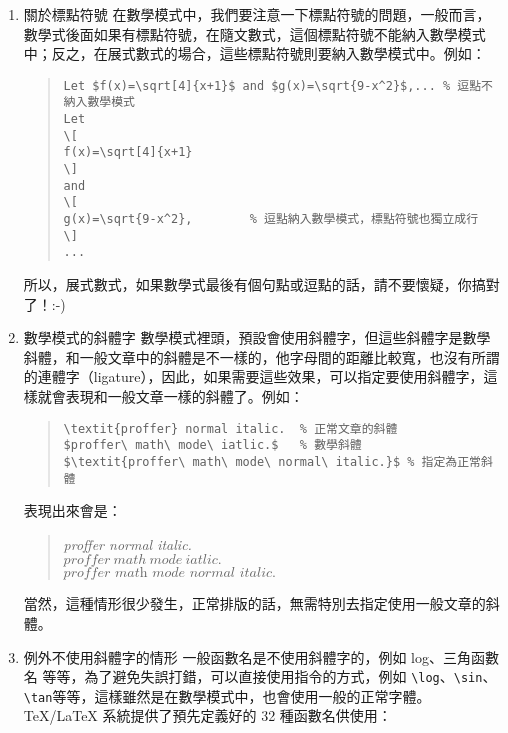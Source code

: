 \begin{enumerate}

  \item 關於標點符號 \newline
        在數學模式中，我們要注意一下標點符號的問題，一般而言，數學式後面如果有標點符號，在隨文數式，這個標點符號不能納入數學模式中；反之，在展式數式的場合，這些標點符號則要納入數學模式中。例如：

        \begin{quote}
          \begin{verbatim}
Let $f(x)=\sqrt[4]{x+1}$ and $g(x)=\sqrt{9-x^2}$,... % 逗點不納入數學模式
Let
\[
f(x)=\sqrt[4]{x+1}
\]
and
\[
g(x)=\sqrt{9-x^2},        % 逗點納入數學模式，標點符號也獨立成行
\]
...
\end{verbatim}
        \end{quote}

        所以，展式數式，如果數學式最後有個句點或逗點的話，請不要懷疑，你搞對了！:-)

  \item 數學模式的斜體字 \newline
        數學模式裡頭，預設會使用斜體字，但這些斜體字是數學斜體，和一般文章中的斜體是不一樣的，他字母間的距離比較寬，也沒有所謂的連體字（ligature），因此，如果需要這些效果，可以指定要使用斜體字，這樣就會表現和一般文章一樣的斜體了。例如：

        \begin{quote}
          \begin{verbatim}
\textit{proffer} normal italic.  % 正常文章的斜體
$proffer\ math\ mode\ iatlic.$   % 數學斜體
$\textit{proffer\ math\ mode\ normal\ italic.}$ % 指定為正常斜體
\end{verbatim}
        \end{quote}

        表現出來會是：

        \begin{quote}
          \textit{proffer normal italic.} \\
          $proffer\ math\ mode\ iatlic.$ \\
          $\textit{proffer\ math\ mode\ normal\ italic.}$
        \end{quote}

        當然，這種情形很少發生，正常排版的話，無需特別去指定使用一般文章的斜體。

  \item 例外不使用斜體字的情形 \newline
        一般函數名是不使用斜體字的，例如 log、三角函數名 \chdots{} 等等，為了避免失誤打錯，可以直接使用指令的方式，例如 \verb|\log|、\verb|\sin|、\verb|\tan|\chdots{}等等，這樣雖然是在數學模式中，也會使用一般的正常字體。\TeX{}/\LaTeX{} 系統提供了預先定義好的 32 種函數名供使用：


\end{enumerate}
